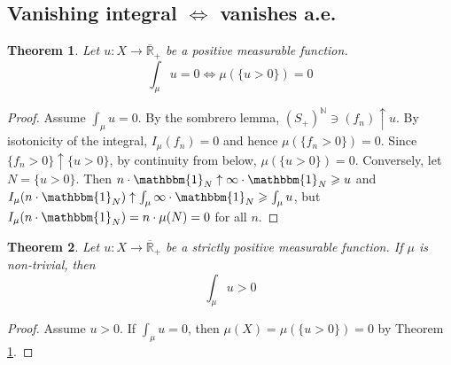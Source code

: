 \documentclass[11pt, a4paper, openany]{book}
\newtheorem{thm}{Theorem}\newtheorem{lem}{Lemma}\newtheorem{crl}{Corollary}
\theoremstyle{definition}
\newcommand{\er}{\overline{\mathbb{R}}}
\begin{document}
\subsection{Vanishing integral \texorpdfstring{$\Longleftrightarrow$}{<->} vanishes a.e.}
    \begin{thm}\label{null integral}
        Let $u:X\rightarrow \er_+$ be a positive measurable function.
        \[
            \int_\mu u=0\Longleftrightarrow \mu(\{u>0\})=0
        \]
    \end{thm}
    \begin{proof}
        Assume $\int_\mu u=0$. By the sombrero lemma, $(S_+)^\mathbb{N}\ni (f_n)\uparrow u$. By isotonicity of the integral, $I_\mu(f_n)=0$ and hence $\mu(\{f_n>0\})=0$. Since $\{f_n>0\}\uparrow \{u>0\}$, by continuity from below, $\mu(\{u>0\})=0$. Conversely, let $N=\{u>0\}$. Then $n\cdot \mathbbm{1}_N\uparrow \infty\cdot \mathbbm{1}_N\geqslant u$ and $I_\mu(n\cdot \mathbbm{1}_N)\uparrow \int_\mu\infty\cdot \mathbbm{1}_N\geqslant \int_\mu u$, but $I_\mu(n\cdot \mathbbm{1}_N)=n\cdot \mu(N)=0$ for all $n$.
    \end{proof}
    \begin{thm}
        Let $u:X\rightarrow \er_+$ be a strictly positive measurable function. If $\mu$ is non-trivial, then
        \[
            \int_\mu u>0
        \]
    \end{thm}
    \begin{proof}
        Assume $u>0$. If $\int_\mu u=0$, then $\mu(X)=\mu(\{u>0\})=0$ by Theorem \ref{null integral}.
    \end{proof}
\end{document}
